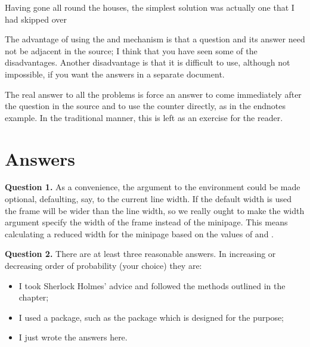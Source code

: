 {{{{    Having gone all round the houses, the simplest solution was actually
one that I had skipped over
\begin{lcode}
%
\end{lcode}  

    The advantage of using the \cmd{\label} and \cmd{\ref} mechanism is that
a question and its answer need not be adjacent in the source; I think that
you have seen some of the disadvantages. Another disadvantage is that it
is difficult to use, although not impossible, if you want the answers in
a separate document.

    The real answer to all the problems is force an answer to come immediately
after the question in the source and to use the  counter
directly, as in the endnotes example. In the traditional manner,
this is left as an exercise for the 
reader.




\section{Answers}

\noindent\textbf{Question 1.} As a convenience, the 
argument to the 
environment could be made optional, defaulting, say, to the current
line width. If the default width is used the frame will be wider
than the line width, so we really ought to make the width argument
specify the width of the frame instead of the minipage. This 
means calculating a reduced width for the minipage based on
the values of \lnc{\fboxsep} and \lnc{\fboxrule}.
\begin{lcode}
\newsavebox{\minibox}
\newlength{\minilength}
\newenvironment{framedminipage}[1][\linewidth]{%
  \setlength{\minilength}{#1}
  \addtolength{\minilength}{-2\fboxsep} 
  \addtolength{\minilength}{-2\fboxrule}
  \begin{lrbox}{\minibox}\begin{minipage}{\minilength}}%
  {\end{minipage}\end{lrbox}\fbox{\usebox{\minibox}}}
\end{lcode}


\vspace{\onelineskip}
\noindent\textbf{Question 2.} There are at least three reasonable answers.
In increasing or decreasing order of probability (your choice) they are:
\begin{itemize}
\item I took Sherlock Holmes' advice and followed the methods outlined
   in the chapter;
\item I used a package, such as the  package which is designed
  for the purpose;
\item I just wrote the answers here.
\end{itemize}

}}}}
